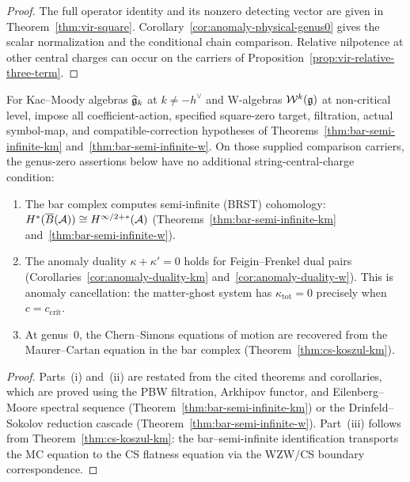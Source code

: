 \begin{proof}
The full operator identity and its nonzero detecting vector are given in Theorem~\ref{thm:vir-square}.
Corollary~\ref{cor:anomaly-physical-genus0} gives the scalar normalization and the conditional chain comparison.
Relative nilpotence at other central charges can occur on the carriers of Proposition~\ref{prop:vir-relative-three-term}.
\end{proof}

\begin{theorem}\label{thm:anomaly-physical-km-w}
For Kac--Moody algebras $\widehat{\mathfrak{g}}_k$ at $k\neq-h^\vee$ and W-algebras $\mathcal W^k(\mathfrak{g})$ at non-critical level, impose all coefficient-action, specified square-zero target, filtration, actual symbol-map, and compatible-correction hypotheses of Theorems~\ref{thm:bar-semi-infinite-km} and~\ref{thm:bar-semi-infinite-w}.
On those supplied comparison carriers, the genus-zero assertions below have no additional string-central-charge condition:
\begin{enumerate}[label=\textup{(\roman*)}]
\item The bar complex computes semi-infinite \textup{(}BRST\textup{)}
  cohomology:
  $H^*(\overline{B}(\mathcal{A})) \cong H^{\infty/2+*}(\mathcal{A})$
  \textup{(}Theorems~\textup{\ref{thm:bar-semi-infinite-km}}
  and~\textup{\ref{thm:bar-semi-infinite-w})}.
\item The anomaly duality $\kappa + \kappa' = 0$ holds for
  Feigin--Frenkel dual pairs
  \textup{(}Corollaries~\textup{\ref{cor:anomaly-duality-km}}
  and~\textup{\ref{cor:anomaly-duality-w})}.
  This is anomaly cancellation: the matter-ghost system has
  $\kappa_{\mathrm{tot}} = 0$ precisely when
  $c = c_{\mathrm{crit}}$.
\item At genus~$0$, the Chern--Simons equations of motion
  are recovered from the Maurer--Cartan equation in the bar
  complex \textup{(}Theorem~\textup{\ref{thm:cs-koszul-km})}.
\end{enumerate}
\end{theorem}

\begin{proof}
Parts~(i) and~(ii) are restated from the cited theorems and
corollaries, which are proved using the PBW filtration,
Arkhipov functor, and Eilenberg--Moore spectral sequence
(Theorem~\ref{thm:bar-semi-infinite-km}) or the
Drinfeld--Sokolov reduction cascade
(Theorem~\ref{thm:bar-semi-infinite-w}).
Part~(iii) follows from Theorem~\ref{thm:cs-koszul-km}:
the bar--semi-infinite identification transports the MC equation
to the CS flatness equation via the WZW/CS boundary correspondence.
\end{proof}

